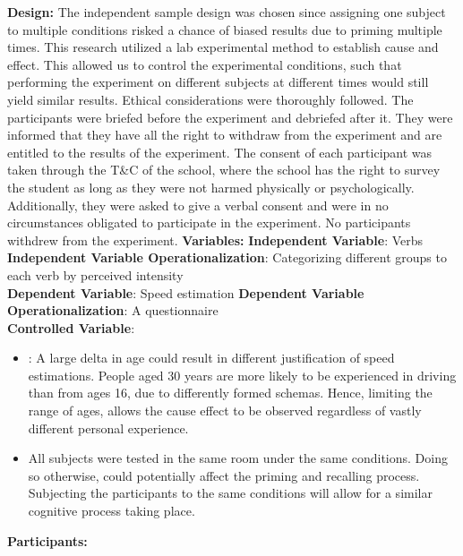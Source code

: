 \documentclass[11pt]{article}
\begin{document}
\textbf{Design:} \newline
The independent sample design was chosen since assigning one subject to multiple conditions risked a chance of biased results due to priming multiple times. This research utilized a lab experimental method to establish cause and effect. 
This allowed us to control the experimental conditions, such that performing the experiment on different subjects at different times would still yield similar results.
Ethical considerations were thoroughly followed. The participants were briefed before the experiment and debriefed after it. They were informed that they have all the right to withdraw from the experiment and are entitled to the results of the experiment.
The consent of each participant was taken through the T\&C of the school, where the school has the right to survey the student as long as they were not harmed physically or psychologically. Additionally, they were asked to give a verbal consent and were in no circumstances obligated to participate in the experiment.
No participants withdrew from the experiment. \newline
\textbf{Variables:}\newline
\textbf{Independent Variable}: Verbs\newline 
\textbf{Independent Variable Operationalization}: Categorizing different groups to each verb by perceived intensity\\
\textbf{Dependent Variable}: Speed estimation\newline
\textbf{Dependent Variable Operationalization}: A questionnaire \\
\textbf{Controlled Variable}: 
\begin{itemize}
  \item {}: A large delta in age could result in different justification of speed estimations. People aged 30 years are more likely to be experienced in driving than from ages 16, due to differently formed schemas. Hence, limiting the range of ages, allows the cause effect to be observed regardless of vastly different personal experience.
  \item {} All subjects were tested in the same room under the same conditions. Doing so otherwise, could potentially affect the priming and recalling process. Subjecting the participants to the same conditions will allow for a similar cognitive process taking place.
\end{itemize}
\textbf{Participants:}\newline
\end{document}
